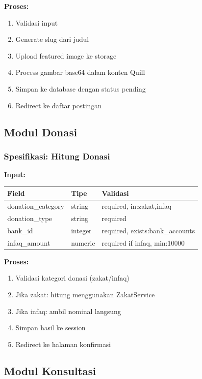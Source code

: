 \documentclass[12pt,a4paper]{article}
\begin{document}
\textbf{Proses:}
\begin{enumerate}
    \item Validasi input
    \item Generate slug dari judul
    \item Upload featured image ke storage
    \item Process gambar base64 dalam konten Quill
    \item Simpan ke database dengan status pending
    \item Redirect ke daftar postingan
\end{enumerate}

\subsection{Modul Donasi}

\subsubsection{Spesifikasi: Hitung Donasi}

\textbf{Input:}
\begin{table}[h]
\centering
\begin{tabular}{|l|l|l|}
\hline
\textbf{Field} & \textbf{Tipe} & \textbf{Validasi} \\
\hline
donation\_category & string & required, in:zakat,infaq \\
donation\_type & string & required \\
bank\_id & integer & required, exists:bank\_accounts \\
infaq\_amount & numeric & required if infaq, min:10000 \\
\hline
\end{tabular}
\end{table}

\textbf{Proses:}
\begin{enumerate}
    \item Validasi kategori donasi (zakat/infaq)
    \item Jika zakat: hitung menggunakan ZakatService
    \item Jika infaq: ambil nominal langsung
    \item Simpan hasil ke session
    \item Redirect ke halaman konfirmasi
\end{enumerate}

\subsection{Modul Konsultasi}
\end{document}
